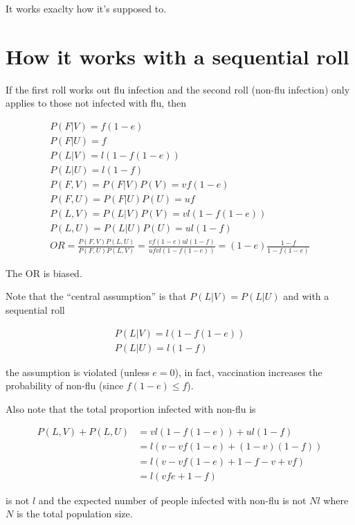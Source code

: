 \documentclass[
]{article}
\begin{document}
It works exaclty how it's supposed to.

\hypertarget{how-it-works-with-a-sequential-roll}{%
\section{How it works with a sequential roll}\label{how-it-works-with-a-sequential-roll}}

If the first roll works out flu infection and the second roll (non-flu infection) only applies to those not infected with flu, then

\[
\begin{gathered}
P(F|V) = f(1-e) \\
P(F|U) = f \\
P(L|V) = l(1 - f(1 - e)) \\
P(L|U) = l(1-f) \\
P(F,V) = P(F|V)P(V) = vf(1-e) \\
P(F,U) = P(F|U)P(U) = uf \\
P(L,V) = P(L|V)P(V) = vl(1 - f(1 - e)) \\
P(L,U) = P(L|U)P(U) = ul(1-f) \\
OR = \frac{P(F,V)P(L,U)}{P(F,U)P(L,V)}=\frac{vf(1-e)ul(1-f)}{ufvl(1 - f(1 - e))} = (1-e)\frac{1-f}{1-f(1-e)}
\end{gathered}
\]

The OR is biased.

Note that the ``central assumption'' is that \(P(L|V) = P(L|U)\) and with a sequential roll

\[
\begin{gathered}
P(L|V) = l(1 - f(1 - e)) \\
P(L|U) = l(1-f)
\end{gathered}
\]

the assumption is violated (unless \(e=0\)), in fact, vaccination increases the probability of non-flu (since \(f(1 - e) \leq f\)).

Also note that the total proportion infected with non-flu is

\[
\begin{aligned}
P(L,V) + P(L,U) &= vl(1 - f(1 - e)) + ul(1-f) \\  
&= l(v - vf(1-e) + (1-v)(1-f)) \\
&= l(v - vf(1-e) + 1 - f -v + vf) \\
&= l(vfe + 1 - f)
\end{aligned}
\]

is not \(l\) and the expected number of people infected with non-flu is not \(Nl\) where \(N\) is the total population size.
\end{document}
